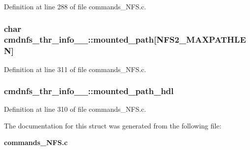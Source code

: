 Definition at line 288 of file commands\_\-NFS.c.
\subsubsection[{mounted\_\-path}]{\setlength{\rightskip}{0pt plus 5cm}char {\bf cmdnfs\_\-thr\_\-info\_\-\_\-::mounted\_\-path}[NFS2\_\-MAXPATHLEN]}\label{structcmdnfs__thr__info_____afeeffda7da14477bd029846cf854a70}




Definition at line 311 of file commands\_\-NFS.c.
\subsubsection[{mounted\_\-path\_\-hdl}]{ {\bf cmdnfs\_\-thr\_\-info\_\-\_\-::mounted\_\-path\_\-hdl}}\label{structcmdnfs__thr__info_____f5b218cad30ccd192ef64258f8a529cc}




Definition at line 310 of file commands\_\-NFS.c.

The documentation for this struct was generated from the following file:\begin{CompactItemize}
\item 
{\bf commands\_\-NFS.c}\end{CompactItemize}

